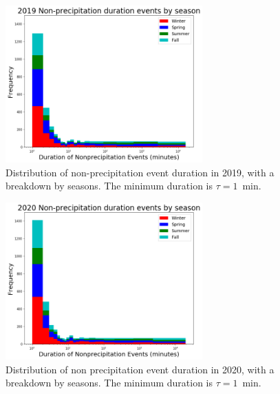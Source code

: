 \documentclass[11pt]{report}
\begin{document}
\clearpage
\begin{figure}[t]
	\centering
	\includegraphics[width=0.675\textwidth]{Figures/nonprecip_2019.png}
	\caption[Histogram of non-precipitation events for 2019 broken
	down by season]{\label{np2019} Distribution of
		non-precipitation event duration in 2019, with a breakdown
		by seasons. The minimum duration is $\tau=1$~min. %
	}
\end{figure}

\begin{figure}[b]
	\centering
	\includegraphics[width=0.675\textwidth]{Figures/nonprecip_2020.png}
	\caption[Histogram of non-precipitation events for 2020 broken down
          by season]{\label{np2020} Distribution of non precipitation event
          duration in 2020, with a breakdown by seasons. The minimum
          duration is $\tau=1$~min.}
\end{figure}
\end{document}
